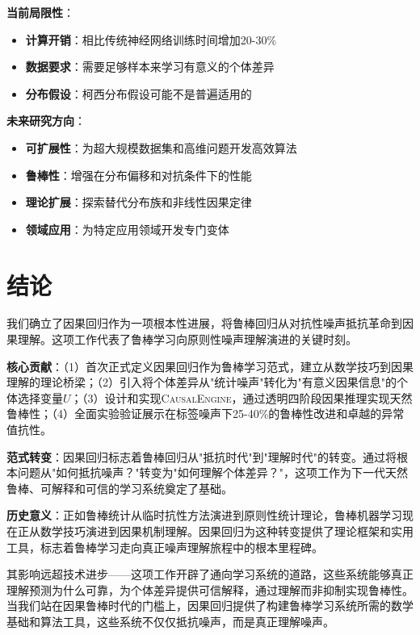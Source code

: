 \documentclass[conference]{IEEEtran}
\newcommand{\causalengine}{\textsc{CausalEngine}}
\begin{document}
\begin{CJK}{UTF8}{gbsn}
\textbf{当前局限性}：
\begin{itemize}
\item \textbf{计算开销}：相比传统神经网络训练时间增加20-30\%
\item \textbf{数据要求}：需要足够样本来学习有意义的个体差异
\item \textbf{分布假设}：柯西分布假设可能不是普遍适用的
\end{itemize}

\textbf{未来研究方向}：
\begin{itemize}
\item \textbf{可扩展性}：为超大规模数据集和高维问题开发高效算法
\item \textbf{鲁棒性}：增强在分布偏移和对抗条件下的性能
\item \textbf{理论扩展}：探索替代分布族和非线性因果定律
\item \textbf{领域应用}：为特定应用领域开发专门变体
\end{itemize}

\section{结论}
\label{sec:conclusion}

我们确立了因果回归作为一项根本性进展，将鲁棒回归从对抗性噪声抵抗革命到因果理解。这项工作代表了鲁棒学习向原则性噪声理解演进的关键时刻。

\textbf{核心贡献}：（1）首次正式定义因果回归作为鲁棒学习范式，建立从数学技巧到因果理解的理论桥梁；（2）引入将个体差异从"统计噪声"转化为"有意义因果信息"的个体选择变量$U$；（3）设计和实现\causalengine{}，通过透明四阶段因果推理实现天然鲁棒性；（4）全面实验验证展示在标签噪声下25-40\%的鲁棒性改进和卓越的异常值抗性。

\textbf{范式转变}：因果回归标志着鲁棒回归从"抵抗时代"到"理解时代"的转变。通过将根本问题从"如何抵抗噪声？"转变为"如何理解个体差异？"，这项工作为下一代天然鲁棒、可解释和可信的学习系统奠定了基础。

\textbf{历史意义}：正如鲁棒统计从临时抗性方法演进到原则性统计理论，鲁棒机器学习现在正从数学技巧演进到因果机制理解。因果回归为这种转变提供了理论框架和实用工具，标志着鲁棒学习走向真正噪声理解旅程中的根本里程碑。

其影响远超技术进步——这项工作开辟了通向学习系统的道路，这些系统能够真正理解预测为什么可靠，为个体差异提供可信解释，通过理解而非抑制实现鲁棒性。当我们站在因果鲁棒时代的门槛上，因果回归提供了构建鲁棒学习系统所需的数学基础和算法工具，这些系统不仅仅抵抗噪声，而是真正理解噪声。


\end{CJK}
\end{document}
